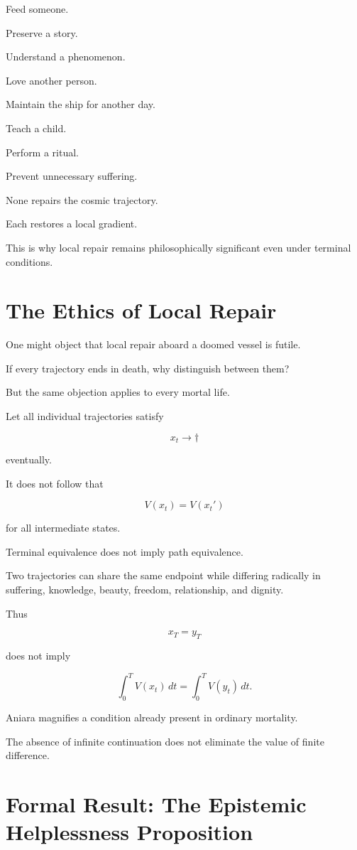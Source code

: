 \documentclass[11pt,oneside]{book}
\theoremstyle{definition}
\theoremstyle{remark}
\begin{document}
Feed someone.

Preserve a story.

Understand a phenomenon.

Love another person.

Maintain the ship for another day.

Teach a child.

Perform a ritual.

Prevent unnecessary suffering.

None repairs the cosmic trajectory.

Each restores a local gradient.

This is why local repair remains philosophically significant even under terminal conditions.

\section{The Ethics of Local Repair}

One might object that local repair aboard a doomed vessel is futile.

If every trajectory ends in death, why distinguish between them?

But the same objection applies to every mortal life.

Let all individual trajectories satisfy

\[
x_t\rightarrow\dagger
\]

eventually.

It does not follow that

\[
V(x_t)=V(x_t')
\]

for all intermediate states.

Terminal equivalence does not imply path equivalence.

Two trajectories can share the same endpoint while differing radically in suffering, knowledge, beauty, freedom, relationship, and dignity.

Thus

\[
x_T=y_T
\]

does not imply

\[
\int_0^T V(x_t)\,dt
=
\int_0^T V(y_t)\,dt.
\]

Aniara magnifies a condition already present in ordinary mortality.

The absence of infinite continuation does not eliminate the value of finite difference.

\section{Formal Result: The Epistemic Helplessness Proposition}
\end{document}
